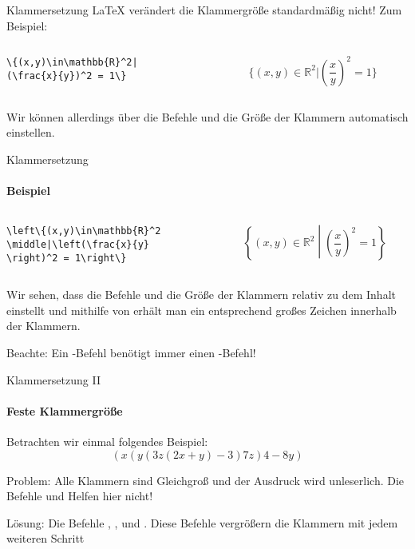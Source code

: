 \begin{frame}[fragile]{Klammersetzung}
\LaTeX{} verändert die Klammergröße standardmäßig \alert{nicht}! Zum Beispiel: 
\begin{columns}
\begin{column}{0.55\textwidth}
\begin{codeblock}
\begin{verbatim}
\{(x,y)\in\mathbb{R}^2|
(\frac{x}{y})^2 = 1\}
\end{verbatim}
\end{codeblock}
\end{column}
\begin{column}{0.35\textwidth}
\[
    \{(x,y)\in\mathbb{R}^2|(\frac{x}{y})^2 = 1\}
\]
\end{column}
\end{columns}

\medskip\pause
Wir können allerdings über die Befehle  und  die Größe der Klammern automatisch einstellen.
\end{frame}

\begin{frame}[fragile]{Klammersetzung}
\framesubtitle{Beispiel}
\begin{columns}
\begin{column}{0.55\textwidth}
\begin{codeblock}
\begin{verbatim}
\left\{(x,y)\in\mathbb{R}^2
\middle|\left(\frac{x}{y}
\right)^2 = 1\right\}
\end{verbatim}
\end{codeblock}
\end{column}
\begin{column}{0.35\textwidth}
\[
    \left\{(x,y)\in\mathbb{R}^2\middle|\left(\frac{x}{y}\right)^2 = 1\right\}
\]
\end{column}
\end{columns}\pause
Wir sehen, dass die Befehle  und  die Größe der Klammern relativ zu dem Inhalt einstellt und mithilfe von  erhält man ein entsprechend großes Zeichen innerhalb der Klammern. 

\medskip\pause
Beachte: \alert{Ein -Befehl benötigt immer einen -Befehl!}
\end{frame}

\begin{frame}[fragile]{Klammersetzung II}
\framesubtitle{Feste Klammergröße}
Betrachten wir einmal folgendes Beispiel:
\[
    (x(y(3z(2x+y)-3)7z)4-8y)
\]

\medskip\pause
Problem: Alle Klammern sind Gleichgroß und der Ausdruck wird unleserlich. Die Befehle  und  Helfen hier nicht!

\medskip\pause
Lösung: Die Befehle , ,  und . Diese Befehle vergrößern die Klammern mit jedem weiteren Schritt
\end{frame}

